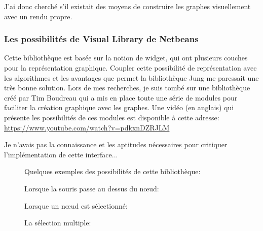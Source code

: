 \documentclass[french]{article}
\begin{document}
     J'ai donc cherché s'il existait des moyens de construire les graphes visuellement
     avec un rendu propre.

		\subsubsection{Les possibilités de Visual Library de Netbeans}

      Cette bibliothèque est basée sur la notion de widget, qui ont plusieurs couches
      pour la représentation graphique. Coupler cette possibilité de représentation
      avec les algorithmes et les avantages que permet la bibliothèque Jung
      me paressait une très bonne solution.
      Lors de mes recherches, je suis tombé sur une bibliothèque créé par
      Tim Boudreau qui a mis en place toute une série de modules pour faciliter
      la création graphique avec les graphes. Une vidéo (en anglais) qui
      présente les possibilités de ces modules est disponible à cette adresse: 
      \url{https://www.youtube.com/watch?v=pdkxnDZRJLM}
      
      Je n'avais pas la connaissance et les aptitudes nécessaires pour
      critiquer l'implémentation de cette interface...
      
     
      
      \begin{figure}[h!]
     	\centering
     	\caption{Quelques exemples des possibilités de cette bibliothèque:}
    \end{figure}
     
      
      
      
      \begin{figure}[h!]
     	\centering
     	\caption{Lorsque la souris passe au dessus du nœud:}
    \end{figure}

      
      \begin{figure}[h!]
     	\centering
     	\caption{Lorsque un nœud est sélectionné:}
    \end{figure}

		
		
		\begin{figure}[h!]
     	\centering
     	\caption{La sélection multiple:}
    \end{figure}      
\clearpage
\end{document}
